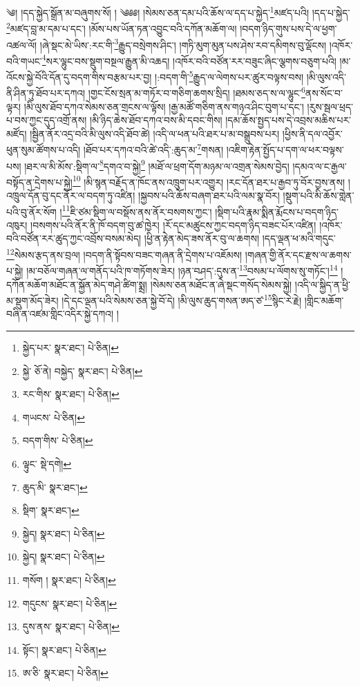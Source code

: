 \setcounter{footnote}{0} 
༄། །དད་སྐྱེད་སྒྲོན་མ་བཞུགས་སོ། ། ༄༅༅། །སེམས་ཅན་དམ་པའི་ཆོས་ལ་དད་པ་སྐྱེད་\footnote{སྐྱེད་པར་  སྣར་ཐང་།  པེ་ཅིན། }མཛད་པའི། །དད་པ་སྐྱེད་\footnote{སྐྱེ་  ཅོ་ནེ། བསྐྱེད་  སྣར་ཐང་།  པེ་ཅིན། }མཛད་བླ་མ་དམ་པ་དང་། །མོས་པས་ཡོན་ཏན་འབྱུང་བའི་དཀོན་མཆོག་ལ། །བདག་ཉིད་གུས་པས་དེ་ལ་ཕྱག་འཚལ་ལོ། །ཞེ་སྡང་མེ་ཡིས་:རང་གི་\footnote{རང་གིས་  སྣར་ཐང་།  པེ་ཅིན། }རྒྱུད་བསྲེགས་ཤིང་། །གཏི་མུག་མུན་པས་ཤེས་རབ་དམིགས་བུ་ལྡོངས། །འཁོར་བའི་གཡང་\footnote{གཡངས་  པེ་ཅིན། }སར་ལྷུང་བས་སྡུག་བསྔལ་རྒྱུན་མི་འཆད། །འཁོར་བའི་བཙོན་རར་བཟུང་ཞིང་ལྕགས་བཅུག་པའི། །མ་འོངས་སྐྱེ་བོའི་དོན་དུ་བདག་གིས་བརྩམ་པར་བྱ། །:བདག་གི་\footnote{བདག་གིས་  པེ་ཅིན། }རྒྱུད་ལ་ལེགས་པར་ཚུར་བལྟས་བས། །མི་ལུས་འདི་ནི་ཤིན་ཏུ་ཐོབ་པར་དཀའ། །གྱང་ངོས་སྲན་མ་གཏོར་བ་གཅིག་ཆགས་སྲིད། །ཐམས་ཅད་ས་ལ་ལྷུང་\footnote{ལྟུང་  སྡེ་དགེ། }ནས་སོང་བ་ལྟར། །མི་ལུས་ཐོབ་དཀའ་སེམས་ཅན་གྲངས་ལ་ལྟོས། །རྒྱ་མཚོ་གཅིག་ནས་གཉའ་ཤིང་བུག་པ་དང་། །རུས་སྦལ་ཕྲད་པ་བས་ཀྱང་དུད་འགྲོ་ནས། །མི་ཉིད་ཆེས་ཐོབ་དཀའ་བས་མི་དབང་གིས། །དམ་ཆོས་སྤྱད་པས་དེ་འབྲས་མཆིས་པར་མཛོད། །སྦྱིན་ནོར་འདྲ་བའི་མི་ལུས་འདི་ཐོབ་ཚེ། །འདི་ལ་ཕན་པའི་ཐར་པ་མ་བསྒྲུབས་པར། །ཕྱིས་ནི་དལ་འབྱོར་ཕུན་སུམ་ཚོགས་པ་འདི། །ཐོབ་པར་དཀའ་བའི་ཚེ་འདི་:ཆུད་མ་\footnote{ཆུད་མི་  སྣར་ཐང་། }གསན། །འཇིག་རྟེན་སྤྱོད་པ་དག་ལ་ཕར་བལྟས་པས། །ཐར་ལ་མི་མོས་:སྡིག་ལ་\footnote{སྡིག་  སྣར་ཐང་། }དགའ་བ་སྐྱེ།\footnote{སྐྱེད།  སྣར་ཐང་།  པེ་ཅིན། } །མཐོ་ལ་ཕྲག་དོག་མཉམ་ལ་འགྲན་སེམས་བྱེད། །དམའ་ལ་ང་རྒྱལ་བསྟོད་ན་དྲེགས་པ་སྐྱེ།\footnote{སྐྱེད།  སྣར་ཐང་།  པེ་ཅིན། } །མི་སྙན་བརྗོད་ན་ཁོང་ནས་འཁྲུག་པར་འགྱུར། །རང་དོན་ཐར་པ་རྒྱབ་ཏུ་བོར་བྱས་ནས། །འཁྲུལ་དོན་བུ་དང་ནོར་ལ་བདག་ཏུ་འཛིན། །སྐྱབས་པའི་ཆོས་བཞག་ཐར་པའི་ལམ་སྣ་བོར། །སྡུག་པའི་མི་ཆོས་གླེན་པའི་བུ་ནོར་སོག །\footnote{གསོག །  སྣར་ཐང་།  པེ་ཅིན། }ཇི་ཙམ་སྡིག་ལ་བསྡོས་ནས་ནོར་བསགས་ཀྱང་། །སྡིག་པའི་རྣམ་སྨིན་རྨོངས་པ་བདག་ཉིད་འཁུར། །བསགས་པའི་ནོར་ནི་ཁོ་བདག་བུ་ཚ་ཁྱེར། །རོ་དང་མཚུངས་ཀྱང་བདག་ཉིད་བཟང་པོར་འཛིན། །འཁོར་བའི་བཙོན་རར་ཚུད་ཀྱང་འབྲོས་བསམ་མེད། །ཕྱི་ན་རྟེན་མེད་ཟས་ནོར་བུ་ལ་ཆགས། །དད་ལྡན་ཕ་མའི་གདུང་\footnote{གདུངས་  སྣར་ཐང་།  པེ་ཅིན། }སེམས་རྩད་ནས་བྲལ། །བདག་ནི་སྟོབས་བཟང་གཞན་ནི་དྲེགས་པ་འཇོམས། །གཞན་གྱི་ནོར་དང་རྫས་ལ་ཆགས་པ་སྐྱེ། །མ་བཅོལ་གཞན་ལ་གནོད་པའི་ཁ་གཏོགས་ཟེར། །ཉན་བཤད་:དུས་ན་\footnote{དུས་ནས་  སྣར་ཐང་།  པེ་ཅིན། }བསམ་པ་ལོགས་སུ་གཏོང་།\footnote{སྟོང་།  སྣར་ཐང་།  པེ་ཅིན། } །དཀོན་མཆོག་མཐོང་ན་སྐྱོན་མེད་གཤེ་ཚིག་སྨྲ། །སེམས་ཅན་མཐོང་ན་ཞེ་སྡང་གསོད་སེམས་སྐྱེ། །འདི་ལ་སྐྱིད་ན་ཕྱི་མ་སྡུག་མོད་ཟེར། །དེ་དང་ལྡན་པའི་སེམས་ཅན་སྐྱེ་བོ་དེ། །མི་ལུས་ཆུད་གསན་ཨད་ཙ་\footnote{ཨ་ཅི་  སྣར་ཐང་།  པེ་ཅིན། }སྙིང་རེ་རྗེ། །གླིང་མཆོག་བཞི་ན་འཛམ་གླིང་འདིར་སྐྱེ་དཀའ། །

